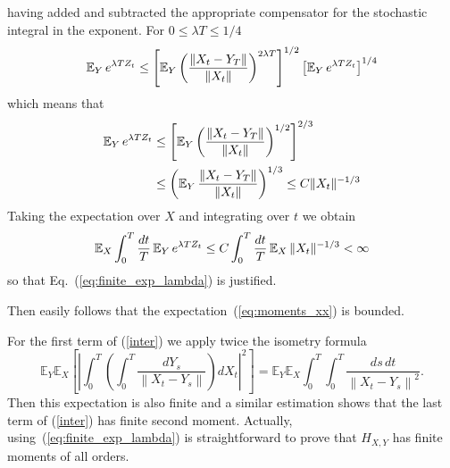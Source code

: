 having added and subtracted the appropriate compensator for the stochastic
integral in the exponent.
For $0 \le \lambda T\le 1/4$
$$
\operatorname{{\mathbb E}}_Y e^{\lambda T Z_t} \le 
\left[ \operatorname{{\mathbb E}}_Y \left(\frac{ \|X_t - Y_T\|}{ \|X_t
 \|}\right)^{2\lambda T}\right]^{1/2} 
\left[\operatorname{{\mathbb E}}_Y e^{ \lambda T Z_t }\right]^{1/4}
$$ 
which means that
\begin{equation*}
\begin{split}
\operatorname{{\mathbb E}}_Y e^{\lambda T Z_t} & \le 
\left[ \operatorname{{\mathbb E}}_Y \left(\frac{ \|X_t - Y_T\|}{ \|X_t
  \|}\right)^{1/2}\right]^{2/3} \\ & \le
 \left( \operatorname{{\mathbb E}}_Y  \frac{ \|X_t - Y_T\|}{ \|X_t
 \|}\right)^{1/3} \le C \| X_t \|^{-1/3}
\end{split}
\end{equation*}
Taking the expectation over $X$ and integrating over $t$ we obtain
$$
\operatorname{{\mathbb E}}_X \int_0^T \frac{dt}{T} \operatorname{{\mathbb E}}_Y e^{\lambda T Z_t} \le 
C \int_0^T \frac{dt}{T}   \operatorname{{\mathbb E}}_X  \| X_t \|^{-1/3} < \infty
$$
so that Eq.~(\ref{eq:finite_exp_lambda}) is justified.

Then easily follows that the expectation~(\ref{eq:moments_xx}) is bounded. 

For the first term of (\ref{inter}) we apply twice the isometry formula 
\begin{equation*}
\mathbb{E}_{Y}\mathbb{E}_{X}\left[ \left| \int_{0}^{T}\left( \int_{0}^{T}%
\frac{dY_{s}}{\left\| X_{t}-Y_{s}\right\| } \right) dX_{t}\right| ^{2}\right]
=\mathbb{E}_{Y}\mathbb{E}_{X}\int_{0}^{T}\int_{0}^{T}
 \frac{  ds \, dt}{\left\| X_{t}-Y_{s}\right\| ^{2}}. 
\end{equation*}
Then this expectation is also finite and a similar estimation shows that the
last term  of (\ref{inter}) has finite second moment.
Actually, using~(\ref{eq:finite_exp_lambda}) is straightforward to prove that
$H_{X,Y}$ has finite moments of all orders. 

